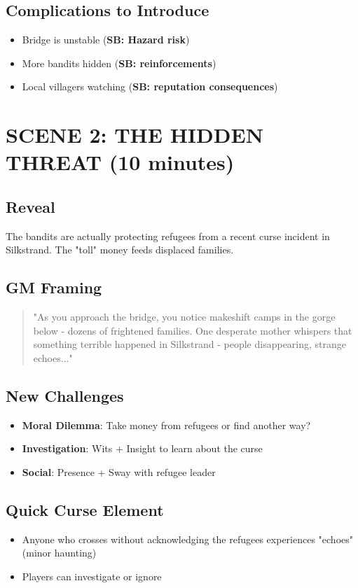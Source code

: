\documentclass[12pt]{article}
\newcommand{\cp}[1]{\textbf{SB: #1}}
\begin{document}
\subsection*{Complications to Introduce}
\begin{itemize}
\item Bridge is unstable (\cp{Hazard risk})
\item More bandits hidden (\cp{reinforcements})
\item Local villagers watching (\cp{reputation consequences})
\end{itemize}

\section{SCENE 2: THE HIDDEN THREAT (10 minutes)}

\subsection*{Reveal}
The bandits are actually protecting refugees from a recent curse incident in Silkstrand. The "toll" money feeds displaced families.

\subsection*{GM Framing}
\begin{quote}
"As you approach the bridge, you notice makeshift camps in the gorge below - dozens of frightened families. One desperate mother whispers that something terrible happened in Silkstrand - people disappearing, strange echoes..."
\end{quote}

\subsection*{New Challenges}
\begin{itemize}
\item \textbf{Moral Dilemma}: Take money from refugees or find another way?
\item \textbf{Investigation}: Wits + Insight to learn about the curse
\item \textbf{Social}: Presence + Sway with refugee leader
\end{itemize}

\subsection*{Quick Curse Element}
\begin{itemize}
\item Anyone who crosses without acknowledging the refugees experiences "echoes" (minor haunting)
\item Players can investigate or ignore
\end{itemize}
\end{document}
